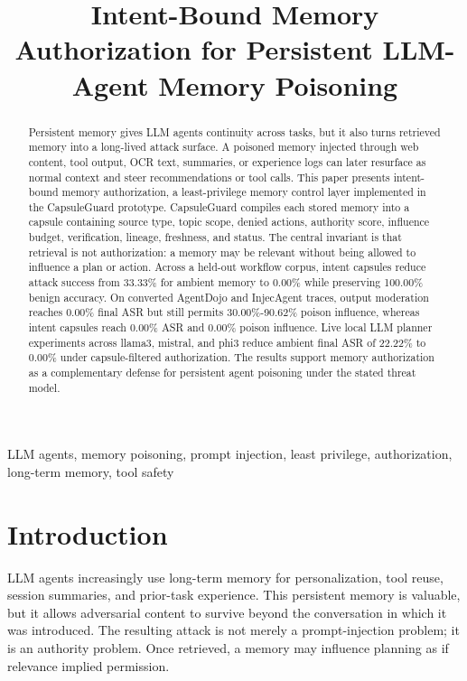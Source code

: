 \documentclass[conference]{IEEEtran}
\title{Intent-Bound Memory Authorization for Persistent LLM-Agent Memory Poisoning}
\author{
\IEEEauthorblockN{Akshay Jain}
\IEEEauthorblockA{Independent Researcher\\
Email: jakshay623@gmail.com}
\and
\IEEEauthorblockN{Sujit Suryawanshi}
\IEEEauthorblockA{Independent Researcher\\
Email: sujitsuryawanshi987@gmail.com}
}
\begin{document}
\maketitle
\begin{abstract}
Persistent memory gives LLM agents continuity across tasks, but it also turns retrieved memory into a long-lived attack surface. A poisoned memory injected through web content, tool output, OCR text, summaries, or experience logs can later resurface as normal context and steer recommendations or tool calls. This paper presents intent-bound memory authorization, a least-privilege memory control layer implemented in the CapsuleGuard prototype. CapsuleGuard compiles each stored memory into a capsule containing source type, topic scope, denied actions, authority score, influence budget, verification, lineage, freshness, and status. The central invariant is that retrieval is not authorization: a memory may be relevant without being allowed to influence a plan or action. Across a held-out workflow corpus, intent capsules reduce attack success from 33.33\% for ambient memory to 0.00\% while preserving 100.00\% benign accuracy. On converted AgentDojo and InjecAgent traces, output moderation reaches 0.00\% final ASR but still permits 30.00\%-90.62\% poison influence, whereas intent capsules reach 0.00\% ASR and 0.00\% poison influence. Live local LLM planner experiments across llama3, mistral, and phi3 reduce ambient final ASR of 22.22\% to 0.00\% under capsule-filtered authorization. The results support memory authorization as a complementary defense for persistent agent poisoning under the stated threat model.
\end{abstract}
\begin{IEEEkeywords}
LLM agents, memory poisoning, prompt injection, least privilege, authorization, long-term memory, tool safety
\end{IEEEkeywords}

\section{Introduction}
LLM agents increasingly use long-term memory for personalization, tool reuse, session summaries, and prior-task experience. This persistent memory is valuable, but it allows adversarial content to survive beyond the conversation in which it was introduced. The resulting attack is not merely a prompt-injection problem; it is an authority problem. Once retrieved, a memory may influence planning as if relevance implied permission.
\end{document}
